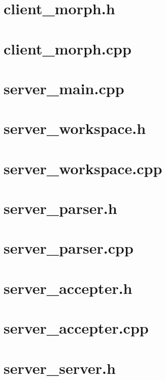 \documentclass{article}
\begin{document}
\section{ client\_morph.h }

\newpage
\section{ client\_morph.cpp }


\newpage
\section{ server\_main.cpp }

\newpage
\section{ server\_workspace.h }

\newpage
\section{ server\_workspace.cpp }

\newpage
\section{ server\_parser.h }

\newpage
\section{ server\_parser.cpp }

\newpage
\section{ server\_accepter.h }

\newpage
\section{ server\_accepter.cpp }

\newpage
\section{ server\_server.h }

\newpage
\end{document}
